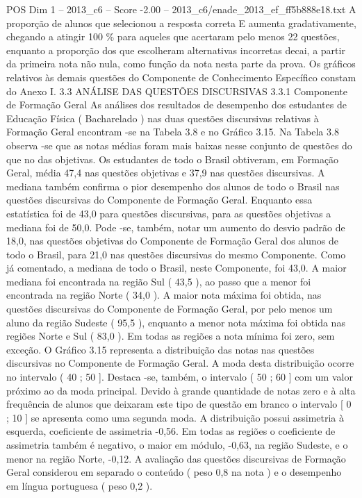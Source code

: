 \begin{textsample}{POS Dim 1 – 2013\_c6 – Score -2.00 – 2013\_c6/enade\_2013\_ef\_ff5b888e18.txt}
A proporção de alunos que selecionou a resposta correta E aumenta gradativamente, chegando a atingir 100 \% para aqueles que acertaram pelo menos 22 questões, enquanto a proporção dos que escolheram alternativas incorretas decai, a partir da primeira nota não nula, como função da nota nesta parte da prova.
Os gráficos relativos às demais questões do Componente de Conhecimento Específico constam do Anexo I. 3.3 ANÁLISE DAS QUESTÕES DISCURSIVAS 3.3.1 Componente de Formação Geral As análises dos resultados de desempenho dos estudantes de Educação Física ( Bacharelado ) nas duas questões discursivas relativas à Formação Geral encontram -se na Tabela 3.8 e no Gráfico 3.15.
Na Tabela 3.8 observa -se que as notas médias foram mais baixas nesse conjunto de questões do que no das objetivas.
Os estudantes de todo o Brasil obtiveram, em Formação Geral, média 47,4 nas questões objetivas e 37,9 nas questões discursivas.
A mediana também confirma o pior desempenho dos alunos de todo o Brasil nas questões discursivas do Componente de Formação Geral.
Enquanto essa estatística foi de 43,0 para questões discursivas, para as questões objetivas a mediana foi de 50,0.
Pode -se, também, notar um aumento do desvio padrão de 18,0, nas questões objetivas do Componente de Formação Geral dos alunos de todo o Brasil, para 21,0 nas questões discursivas do mesmo Componente.
Como já comentado, a mediana de todo o Brasil, neste Componente, foi 43,0.
A maior mediana foi encontrada na região Sul ( 43,5 ), ao passo que a menor foi encontrada na região Norte ( 34,0 ).
A maior nota máxima foi obtida, nas questões discursivas do Componente de Formação Geral, por pelo menos um aluno da região Sudeste ( 95,5 ), enquanto a menor nota máxima foi obtida nas regiões Norte e Sul ( 83,0 ).
Em todas as regiões a nota mínima foi zero, sem exceção.
O Gráfico 3.15 representa a distribuição das notas nas questões discursivas no Componente de Formação Geral.
A moda desta distribuição ocorre no intervalo ( 40 ; 50 ].
Destaca -se, também, o intervalo ( 50 ; 60 ] com um valor próximo ao da moda principal.
Devido à grande quantidade de notas zero e à alta frequência de alunos que deixaram este tipo de questão em branco o intervalo [ 0 ; 10 ] se apresenta como uma segunda moda.
A distribuição possui assimetria à esquerda, coeficiente de assimetria -0,56.
Em todas as regiões o coeficiente de assimetria também é negativo, o maior em módulo, -0,63, na região Sudeste, e o menor na região Norte, -0,12.
A avaliação das questões discursivas de Formação Geral considerou em separado o conteúdo ( peso 0,8 na nota ) e o desempenho em língua portuguesa ( peso 0,2 ).

\end{textsample}
